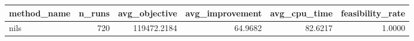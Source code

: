 \begin{tabular}{lrrrrr}
\toprule
method_name & n_runs & avg_objective & avg_improvement & avg_cpu_time & feasibility_rate \\
\midrule
nils & 720 & 119472.2184 & 64.9682 & 82.6217 & 1.0000 \\
\bottomrule
\end{tabular}
